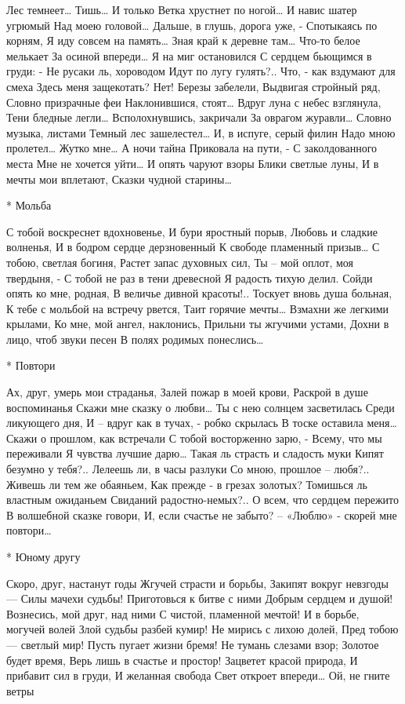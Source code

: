 Лес темнеет… Тишь… И только
Ветка хрустнет по ногой…
И навис шатер угрюмый
Над моею головой…
Дальше, в глушь, дорога уже, -
Спотыкаясь по корням,
Я иду совсем на память…
Зная край к деревне там…
Что-то белое мелькает
За осиной впереди…
Я на миг остановился
С сердцем бьющимся в груди: -
Не русаки ль, хороводом
Идут по лугу гулять?..
Что, - как вздумают для смеха
Здесь меня защекотать?
Нет! Березы забелели,
Выдвигая стройный ряд,
Словно призрачные феи
Наклонившися, стоят…
Вдруг луна с небес взглянула,
Тени бледные легли…
Всполохнувшись, закричали
За оврагом журавли…
Словно музыка, листами
Темный лес зашелестел…
И, в испуге, серый филин
Надо мною пролетел…
Жутко мне… А ночи тайна
Приковала на пути, -
С заколдованного места
Мне не хочется уйти…
И опять чаруют взоры
Блики светлые луны,
И в мечты мои вплетают,
Сказки чудной старины…


* Мольба

С тобой воскреснет вдохновенье,
И бури яростный порыв,
Любовь и сладкие волненья,
И в бодром сердце дерзновенный
К свободе пламенный призыв…
С тобою, светлая богиня,
Растет запас духовных сил,
Ты – мой оплот, моя твердыня, -
С тобой не раз в тени древесной
Я радость тихую делил.
Сойди опять ко мне, родная,
В величье дивной красоты!..
Тоскует вновь душа больная,
К тебе с мольбой на встречу рвется,
Таит горячие мечты…
Взмахни же легкими крылами,
Ко мне, мой ангел, наклонись,
Прильни ты жгучими устами,
Дохни в лицо, чтоб звуки песен
В полях родимых понеслись…


* Повтори

Ах, друг, умерь мои страданья,
Залей пожар в моей крови,
Раскрой в душе воспоминанья
Скажи мне сказку о любви…
Ты с нею солнцем засветилась
Среди ликующего дня,
И – вдруг как в тучах, - робко скрылась
В тоске оставила меня…
Скажи о прошлом, как встречали
С тобой восторженно зарю, -
Всему, что мы переживали
Я чувства лучшие дарю…
Такая ль страсть и сладость муки
Кипят безумно у тебя?..
Лелеешь ли, в часы разлуки
Со мною, прошлое – любя?..
Живешь ли тем же обаяньем,
Как прежде - в грезах золотых?
Томишься ль властным ожиданьем
Свиданий радостно-немых?..
О всем, что сердцем пережито
В волшебной сказке говори,
И, если счастье не забыто? –
«Люблю» - скорей мне повтори…


* Юному другу

Скоро, друг, настанут годы
Жгучей страсти и борьбы,
Закипят вокруг невзгоды —
Силы мачехи судьбы!
Приготовься к битве с ними
Добрым сердцем и душой!
Вознесись, мой друг, над ними
С чистой, пламенной мечтой!
И в борьбе, могучей волей
Злой судьбы разбей кумир!
Не мирись с лихою долей,
Пред тобою — светлый мир!
Пусть пугает жизни бремя!
Не тумань слезами взор;
Золотое будет время,
Верь лишь в счастье и простор!
Зацветет красой природа,
И прибавит сил в груди,
И желанная свобода
Свет откроет впереди…
Ой, не гните ветры

